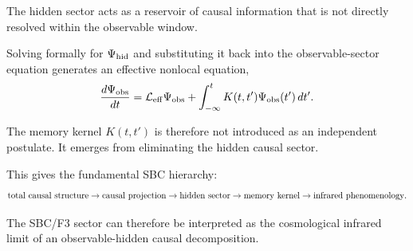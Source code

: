 The hidden sector acts as a reservoir of causal information that is not directly resolved within the observable window.

Solving formally for \(\Psi_{\rm hid}\) and substituting it back into the observable-sector equation generates an effective nonlocal equation,
\begin{equation}
\frac{d\Psi_{\rm obs}}{dt}
=
\mathcal L_{\rm eff}\Psi_{\rm obs}
+
\int_{-\infty}^{t}
K(t,t')
\Psi_{\rm obs}(t')
\,dt'.
\end{equation}

The memory kernel \(K(t,t')\) is therefore not introduced as an independent postulate. It emerges from eliminating the hidden causal sector.

This gives the fundamental SBC hierarchy:
\begin{equation}
{\rm total\ causal\ structure}
\rightarrow
{\rm causal\ projection}
\rightarrow
{\rm hidden\ sector}
\rightarrow
{\rm memory\ kernel}
\rightarrow
{\rm infrared\ phenomenology}.
\end{equation}

The SBC/F3 sector can therefore be interpreted as the cosmological infrared limit of an observable-hidden causal decomposition.
